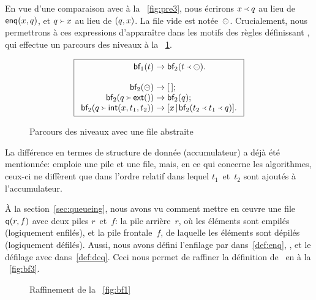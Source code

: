 En vue d'une comparaison avec
 à la
\fig~\vref{fig:pre3}, nous écrirons
\(\enq{x}{q}\) au lieu de
\(\fun{enq}(x,q)\), et
\(\deq{x}{q}\) au lieu de \(\pair{q}{x}\). La
file vide est notée~\(\emq\). Crucialement, nous
permettrons à ces expressions d'apparaître dans les motifs des règles
définissant , qui effectue
un parcours des niveaux à la \fig~\ref{fig:bf1}.
\begin{figure}
\begin{equation*}
\boxed{
\begin{array}{r@{\;}c@{\;}l}
\fun{bf}_1(t) & \rightarrow & \fun{bf}_2(\enq{t}{\emq}).\\
\\
\fun{bf}_2(\emq) & \rightarrow & \el;\\
\fun{bf}_2(\deq{\fun{ext}()}{q}) & \rightarrow & \fun{bf}_2(q);\\
\fun{bf}_2(\deq{\fun{int}(x,t_1,t_2)}{q})
  & \rightarrow & \cons{x}{\fun{bf}_2(\enq{t_2}{\enq{t_1}{q}})}.
\end{array}}
\end{equation*}
\caption{Parcours des niveaux avec une file abstraite\label{fig:bf1}}
\end{figure}
La différence en termes de structure de donnée (accumulateur) a déjà
été mentionnée: 
emploie une pile et  une
file, mais, en ce qui concerne les algorithmes, ceux-ci ne diffèrent
que dans l'ordre relatif dans lequel \(t_1\)~et~\(t_2\) sont ajoutés à
l'accumulateur.

À la section~\ref{sec:queueing}, nous avons vu comment mettre en
{\oe}uvre une file \(\fun{q}(r,f)\) avec deux piles \(r\)~et~\(f\):
 la pile arrière~\(r\), où les éléments sont
empilés (logiquement enfilés), et la pile frontale~\(f\), de laquelle
les éléments sont dépilés (logiquement défilés). Aussi, nous avons
défini l'enfilage par 
dans~\eqref{def:enq}, , et le défilage avec
 dans~\eqref{def:deq}. Ceci nous
permet de raffiner la définition
de~ en
 à la \fig~\vref{fig:bf3}.
\begin{figure}
\abovedisplayskip=0pt
\belowdisplayskip=0pt
\centering
{}
\caption{Raffinement de la \fig~\vref{fig:bf1}\label{fig:bf3}}
\end{figure}

